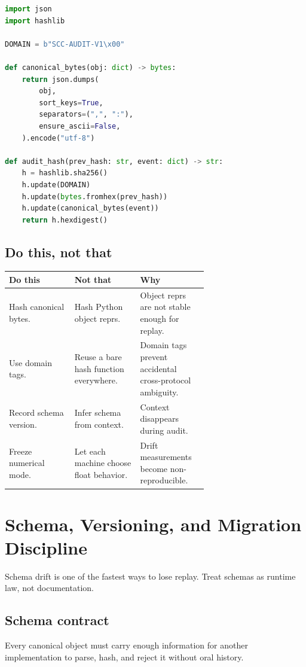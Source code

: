 \documentclass[11pt,oneside]{article}
\begin{document}
\begin{lstlisting}[language=Python,caption={Canonical JSON encoder.}]
import json
import hashlib

DOMAIN = b"SCC-AUDIT-V1\x00"

def canonical_bytes(obj: dict) -> bytes:
    return json.dumps(
        obj,
        sort_keys=True,
        separators=(",", ":"),
        ensure_ascii=False,
    ).encode("utf-8")

def audit_hash(prev_hash: str, event: dict) -> str:
    h = hashlib.sha256()
    h.update(DOMAIN)
    h.update(bytes.fromhex(prev_hash))
    h.update(canonical_bytes(event))
    return h.hexdigest()
\end{lstlisting}

\subsection{Do this, not that}
\begin{tabularx}{\linewidth}{@{}p{0.33\linewidth}p{0.33\linewidth}Y@{}}
\toprule
\textbf{Do this} & \textbf{Not that} & \textbf{Why} \\
\midrule
Hash canonical bytes. & Hash Python object reprs. & Object reprs are not stable enough for replay. \\
Use domain tags. & Reuse a bare hash function everywhere. & Domain tags prevent accidental cross-protocol ambiguity. \\
Record schema version. & Infer schema from context. & Context disappears during audit. \\
Freeze numerical mode. & Let each machine choose float behavior. & Drift measurements become non-reproducible. \\
\bottomrule
\end{tabularx}

\section{Schema, Versioning, and Migration Discipline}
Schema drift is one of the fastest ways to lose replay. Treat schemas as runtime law, not documentation.

\subsection{Schema contract}
Every canonical object must carry enough information for another implementation to parse, hash, and reject it without oral history.
\end{document}

